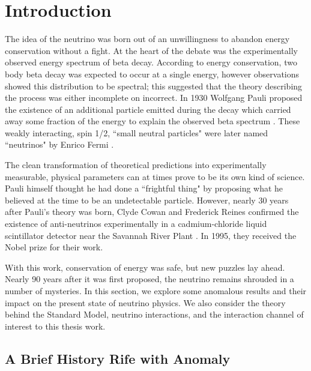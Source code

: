 \section{Introduction}
The idea of the neutrino was born out of an unwillingness to abandon energy conservation without a fight. At the heart of the debate was the experimentally observed energy spectrum of beta decay. According to energy conservation, two body beta decay was expected to occur at a single energy, however observations showed this distribution to be spectral; this suggested that the theory describing the process was either incomplete on incorrect.  In 1930 Wolfgang Pauli proposed the existence of an additional particle emitted during the decay which carried away some fraction of the energy to explain the observed beta spectrum \cite{bib:pauli}. These weakly interacting, spin 1/2, ``small neutral particles" were later named ``neutrinos" by Enrico Fermi \cite{bib:fermi}. 
\par The clean transformation of theoretical predictions into experimentally measurable, physical parameters can at times prove to be its own kind of science. Pauli himself thought he had done a ``frightful thing" by proposing what he believed at the time to be an undetectable particle. However, nearly 30 years after Pauli's theory was born, Clyde Cowan and Frederick Reines confirmed the existence of anti-neutrinos experimentally in a cadmium-chloride liquid scintillator detector near the Savannah River Plant \cite{bib:cowan}. In 1995, they received the Nobel prize for their work.
\par With this work, conservation of energy was safe, but new puzzles lay ahead. Nearly 90 years after it was first proposed, the neutrino remains shrouded in a number of mysteries. In this section, we explore some anomalous results and their impact on the present state of neutrino physics.  We also consider the theory behind the Standard Model, neutrino interactions, and the interaction channel of interest to this thesis work. 

\subsection{A Brief History Rife with Anomaly}
